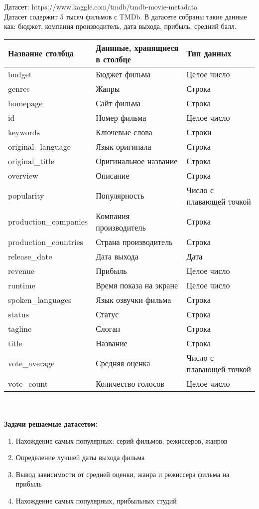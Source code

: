 \documentclass[12pt,a4paper]{article}
\begin{document}
Датасет: https://www.kaggle.com/tmdb/tmdb-movie-metadata\\
Датасет содержит 5 тысяч фильмов с TMDb. В датасете собраны такие данные как: бюджет, компания производитель, дата выхода, прибыль, средний балл.\\ 
\begin{tabular}{ | l | l | l | }
\hline
Название столбца & Даннные, хранящиеся в столбце & Тип данных \\ \hline
budget & Бюджет фильма & Целое число \\
genres & Жанры & Строка \\
homepage & Сайт фильма & Строка \\
id & Номер фильма & Целое число \\
keywords & Ключевые слова & Строки \\
original\_language & Язык оригинала & Строка \\
original\_title & Оригинальное название & Строка \\
overview & Описание & Строка \\
popularity & Популярность & Число с плавающей точкой \\
production\_companies & Компания производитель & Строка \\
production\_countries & Страна производитель & Строка \\
release\_date & Дата выхода & Дата \\
revenue & Прибыль & Целое число \\
runtime & Время показа на экране & Целое число \\
spoken\_languages & Язык озвучки фильма & Строка \\
status & Статус & Строка \\
tagline & Слоган & Строка \\
title & Название & Строка \\
vote\_average & Средняя оценка & Число с плавающей точкой \\
vote\_count & Количество голосов & Целое число \\
\hline
\end{tabular} \\ \\

\textbf{Задачи решаемые датасетом:}
\begin{enumerate} 
  \item Нахождение самых популярных: серий фильмов, режиссеров, жанров
  \item Определение лучшей даты выхода фильма
  \item Вывод зависимости от средней оценки, жанра и режиссера фильма на прибыль
  \item Нахождение самых популярных, прибыльных студий
\end{enumerate}
\end{document}
